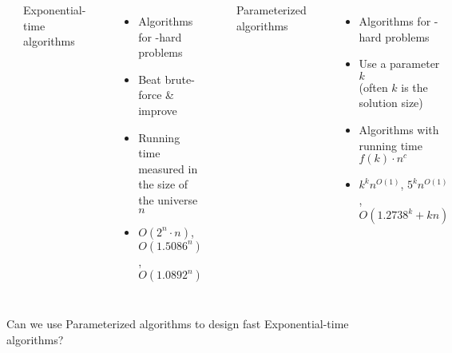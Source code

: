 \begin{frame}
	
	\begin{columns}
		\noindent
		\begin{minipage}[t]{.49\textwidth}
			{\color{Blue}\noindent\rule{\hsize}{4pt}\newline
				\centering Exponential-time algorithms\newline
				\rule{\textwidth}{4pt}}
			\slides{\vspace{-4mm}}
			\begin{itemize}
				\item Algorithms for \NP-hard problems
				\item Beat brute-force \& improve
				\item Running time measured in the size of the universe $n$
				\item $O(2^n\cdot n)$,  $O(1.5086^n)$,  $O(1.0892^n)$
			\end{itemize}
		\end{minipage}%
		\hfill%
		\begin{minipage}[t]{.49\textwidth}
			{\color{Green}\rule{\linewidth}{4pt}\newline
				\centering Parameterized algorithms\newline
				\rule{\linewidth}{4pt}}
			\slides{\vspace{-4mm}}
			\begin{itemize}
				\item Algorithms for \NP-hard problems
				\item Use a parameter $k$\\(often $k$ is the solution size)
				\item Algorithms with running time $f(k)\cdot n^c$
				\item $k^{k}n^{O(1)}$, $5^k n^{O(1)}$, $O(1.2738^k+kn)$ 
			\end{itemize}
		\end{minipage}%
	\end{columns}
    \begin{block}{}
	Can we use Parameterized algorithms to design fast Exponential-time algorithms?
\end{block}
\end{frame}

